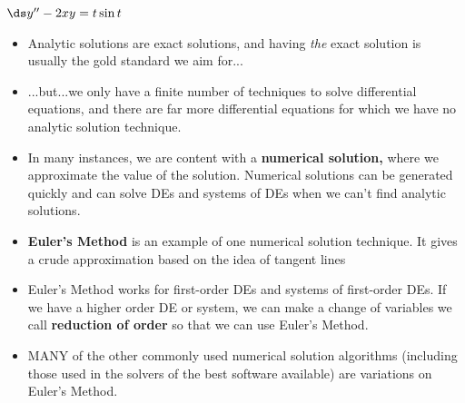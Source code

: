   $\ds y'' - 2xy = t\sin t$\\ \vfill
 \een
\een
\vfill
{}
\begin{itemize}
\item  Analytic solutions are exact solutions, and having {\it the} exact solution is usually
 the gold standard we aim for...
\item ...but...we only have a finite number of techniques to solve differential equations, and there
 are far more differential equations for which we have no analytic solution technique.
\item  In many instances, we are content with a {\bf numerical solution,} where we approximate the
 value of the solution.  Numerical solutions can be generated quickly and can solve DEs
 and systems of DEs when we can't find analytic solutions.
\item  {\bf Euler's Method} is an example of one numerical solution technique.  It gives a crude
 approximation based on the idea of tangent lines
\item  Euler's Method works for first-order DEs and systems of first-order DEs.  If we have a higher
 order DE or system, we can make a change of variables we call {\bf reduction of order} so
 that we can use Euler's Method.
\item  MANY of the other commonly used numerical solution algorithms (including those used
 in the solvers of the best software available) are variations on Euler's Method.
\end{itemize}
